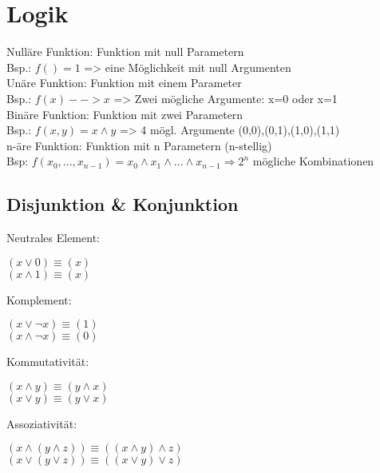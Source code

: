 \section{Logik}
\textcolor{myblue}{Nulläre Funktion:} Funktion mit null Parametern\\
Bsp.: $f() = 1$ \quad		=> eine Möglichkeit mit null Argumenten\\
\textcolor{myblue}{Unäre Funktion:} Funktion mit einem Parameter\\
Bsp.: $f(x) --> x$ \quad	=> Zwei mögliche Argumente: x=0 oder x=1\\
\textcolor{myblue}{Binäre Funktion:} Funktion mit zwei Parametern\\
Bsp.: $f(x, y) = x \wedge y$ \quad	=> 4 mögl. Argumente (0,0),(0,1),(1,0),(1,1)\\
\textcolor{myblue}{n-äre Funktion:} Funktion mit n Parametern (n-stellig)\\
Bsp: $f (x_0,...,x_{n-1}) = x_0 \wedge x_1 \wedge ... \wedge x_{n-1} \Rightarrow 2^n$ mögliche Kombinationen
\subsection{Disjunktion \& Konjunktion}
Neutrales Element:
\vspace{-0.32cm}
\begin{multicols*}{2}
$(x \vee 0) \equiv (x)$\\ 
$(x \wedge 1) \equiv (x)$\\
\end{multicols*}
\vspace{-0.50cm}

Komplement:
\vspace{-0.32cm}
\begin{multicols*}{2}
$(x \vee \neg x) \equiv (1)$\\ 
$(x \wedge \neg x) \equiv (0)$\\ 
\end{multicols*}
\vspace{-0.50cm}

Kommutativität:
\vspace{-0.32cm}
\begin{multicols*}{2}
$(x \wedge y) \equiv (y \wedge x)$\\ 
$(x \vee y) \equiv (y \vee x)$\\
\end{multicols*}
\vspace{-0.50cm}

Assoziativität:
\vspace{-0.32cm}
\begin{multicols*}{2}
$(x \wedge (y \wedge z)) \equiv ((x \wedge y) \wedge z)$\\
$(x \vee (y \vee z)) \equiv ((x \vee y) \vee z)$\\
\end{multicols*}
\vspace{-0.50cm}

